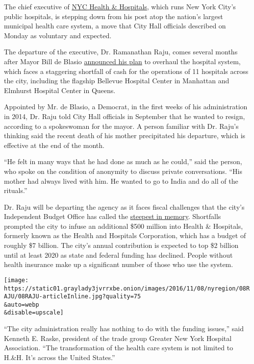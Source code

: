 The chief executive of
\href{http://www.nychealthandhospitals.org/hhc/html/home/home.shtml}{NYC
Health \& Hospitals}, which runs New York City's public hospitals, is
stepping down from his post atop the nation's largest municipal health
care system, a move that City Hall officials described on Monday as
voluntary and expected.

The departure of the executive, Dr. Ramanathan Raju, comes several
months after Mayor Bill de Blasio
\href{http://www.nytimes3xbfgragh.onion/2016/04/26/nyregion/de-blasio-to-propose-2-billion-for-new-york-citys-hospital-system.html}{announced
his plan} to overhaul the hospital system, which faces a staggering
shortfall of cash for the operations of 11 hospitals across the city,
including the flagship Bellevue Hospital Center in Manhattan and
Elmhurst Hospital Center in Queens.

Appointed by Mr. de Blasio, a Democrat, in the first weeks of his
administration in 2014, Dr. Raju told City Hall officials in September
that he wanted to resign, according to a spokeswoman for the mayor. A
person familiar with Dr. Raju's thinking said the recent death of his
mother precipitated his departure, which is effective at the end of the
month.

``He felt in many ways that he had done as much as he could,'' said the
person, who spoke on the condition of anonymity to discuss private
conversations. ``His mother had always lived with him. He wanted to go
to India and do all of the rituals.''

Dr. Raju will be departing the agency as it faces fiscal challenges that
the city's Independent Budget Office has called the
\href{http://www.ibo.nyc.ny.us/iboreports/critical-condition-reviving-the-fiscal-health-of-the-citys-public-hospitals-will-take-state-federal-and-union-cooperation-june-2016.pdf}{steepest
in memory}. Shortfalls prompted the city to infuse an additional \$500
million into Health \& Hospitals, formerly known as the Health and
Hospitals Corporation, which has a budget of roughly \$7 billion. The
city's annual contribution is expected to top \$2 billion until at least
2020 as state and federal funding has declined. People without health
insurance make up a significant number of those who use the system.

\texttt{[image: https://static01.graylady3jvrrxbe.onion/images/2016/11/08/nyregion/08RAJU/08RAJU-articleInline.jpg?quality=75\\\&auto=webp\\\&disable=upscale]}

``The city administration really has nothing to do with the funding
issues,'' said Kenneth E. Raske, president of the trade group Greater
New York Hospital Association. ``The transformation of the health care
system is not limited to H.\&H. It's across the United States.''

